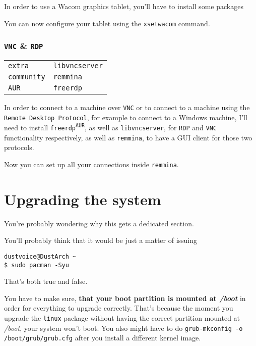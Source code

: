 \documentclass[9pt]{report}
\newenvironment{packagetable}
{\begin{longtabu}to \textwidth [b]{X[1,r]|X[1,l]}}
{\end{longtabu}}
\begin{document}
In order to use a Wacom graphics tablet, you’ll have to install some packages


You can now configure your tablet using the \texttt{xsetwacom} command.



\newpage

\hypertarget{x-vnc-and-rdp}{\subsection{\texttt{VNC} \& \texttt{RDP}}}
\begin{packagetable}
    \texttt{extra} & \texttt{libvncserver} \\ 
    \texttt{community} & \texttt{remmina} \\ 
    \texttt{AUR} & \texttt{freerdp} \\ 
\end{packagetable}

In order to connect to a machine over \texttt{VNC} or to connect to a machine using the \texttt{Remote Desktop Protocol}, for example to connect to a Windows machine, I’ll need to install \texttt{freerdp\textsuperscript{\texttt{AUR}}}, as well as \texttt{libvncserver}, for \texttt{RDP} and \texttt{VNC} functionality respectively, as well as \texttt{remmina}, to have a GUI client for those two protocols.


Now you can set up all your connections inside \texttt{remmina}.



\newpage

\hypertarget{x-upgrading-the-system}{\chapter{Upgrading the system}}
You’re probably wondering why this gets a dedicated section.


You’ll probably think that it would be just a matter of issuing


\begin{verbatim}
dustvoice@DustArch ~
$ sudo pacman -Syu
\end{verbatim}

That’s both true and false.


You have to make sure, \textbf{that your boot partition is mounted at \textit{/boot}} in order for everything to upgrade correctly.
That’s because the moment you upgrade the \texttt{linux} package without having the correct partition mounted at \textit{/boot}, your system won’t boot.
You also might have to do \texttt{grub-mkconfig -o /boot/grub/grub.cfg} after you install a different kernel image.
\end{document}
